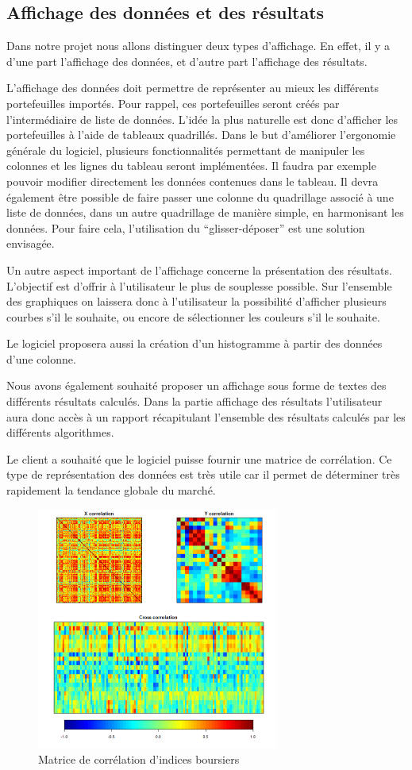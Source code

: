 	\subsection{Affichage des données et des résultats} 
		Dans notre projet nous allons distinguer deux types d'affichage. En effet, il y a d'une part l'affichage des données, et d'autre part l'affichage des résultats.

		L'affichage des données doit permettre de représenter au mieux les différents portefeuilles importés. Pour rappel, ces portefeuilles seront créés par l'intermédiaire de liste de données. L'idée la plus naturelle est donc d'afficher les portefeuilles à l'aide de tableaux quadrillés. Dans le but d'améliorer l'ergonomie générale du logiciel, plusieurs fonctionnalités permettant de manipuler les colonnes et les lignes du tableau seront implémentées. Il faudra par exemple pouvoir modifier directement les données contenues dans le tableau. Il devra également être possible de faire passer une colonne du quadrillage associé à une liste de données, dans un autre quadrillage de manière simple, en harmonisant les données. Pour faire cela, l'utilisation du “glisser-déposer” est une solution envisagée.

		Un autre aspect important de l'affichage concerne la présentation des résultats. L'objectif est d'offrir à l'utilisateur le plus de souplesse possible. Sur l'ensemble des graphiques on laissera donc à l'utilisateur la possibilité d'afficher plusieurs courbes s'il le souhaite, ou encore de sélectionner les couleurs s'il le souhaite.

		Le logiciel proposera aussi la création d'un histogramme à partir des données d'une colonne.

		Nous avons également souhaité proposer un affichage sous forme de textes des différents résultats calculés. Dans la partie affichage des résultats l'utilisateur aura donc accès à un rapport récapitulant l'ensemble des résultats calculés par les différents algorithmes.

		Le client a souhaité que le logiciel puisse fournir une matrice de corrélation. Ce type de représentation des données est très utile car il permet de déterminer très rapidement la tendance globale du marché.

		\begin{figure}[h]
			\center
			\includegraphics[width=300px]{matrice.png}
			\caption{Matrice de corrélation d'indices boursiers}
		\end{figure}


